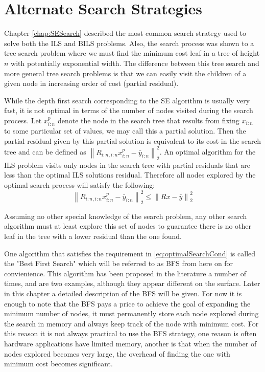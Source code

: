 \documentclass[12pt,Bold,letterpaper]{mcgilletdclass}
\begin{document}
\chapter{Alternate Search Strategies} \label{chap:Searches}

Chapter \ref{chap:SESearch} described the most common search strategy used to solve both the ILS and BILS problems. Also, the search process was shown to a tree search problem where we must find the minimum cost leaf in a tree of height $n$ with potentially exponential width. The difference between this tree search and more general tree search problems is that we can easily visit the children of a given node in increasing order of cost (partial residual). 

While the depth first search corresponding to the SE algorithm is usually very fast, it is not optimal in terms of the number of nodes visited during the search process. Let $x_{i:n}^p$ denote the node in the search tree that results from fixing $x_{i:n}$ to some particular set of values, we may call this a partial solution. Then the partial residual given by this partial solution is equivalent to its cost in the search tree and can be defined as $\left \| R_{i:n,i:n}x_{i:n}^p - \bar{y}_{i:n}\right \|_2^2$. An optimal algorithm for the ILS problem visits only nodes in the search tree with partial residuals that are less than the optimal ILS solutions residual. Therefore all nodes explored by the optimal search process will satisfy the following:
\begin{equation}\label{eq:optimalSearchCond}
\left \| R_{i:n,i:n}x_{i:n}^p - \bar{y}_{i:n}\right \|_2^2 \le \left \| Rx - \bar{y} \right \|_2^2
\end{equation}

Assuming no other special knowledge of the search problem, any other search algorithm must at least explore this set of nodes to guarantee there is no other leaf in the tree with a lower residual than the one found.

One algorithm that satisfies the requirement in \eqref{eq:optimalSearchCond} is called the "Best First Search" which will be referred to as BFS from here on for convienience. This algorithm has been proposed in the literature a number of times, \cite{FukMU04} and \cite{XuWZW04} are two examples, although they appear different on the surface. Later in this chapter a detailed description of the BFS will be given. For now it is enough to note that the BFS pays a price to achieve the goal of expanding the minimum number of nodes, it must permanently store each node explored during the search in memory and always keep track of the node with minimum cost. For this reason it is not always practical to use the BFS strategy, one reason is often hardware applications have limited memory, another is that when the number of nodes explored becomes very large, the overhead of finding the one with minimum cost becomes significant.
\end{document}
